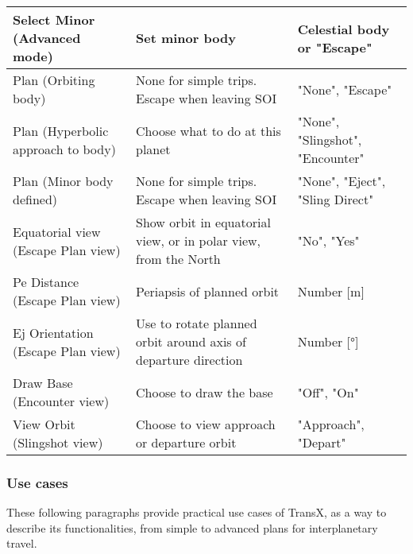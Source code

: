 \documentclass[Orbiter User Manual.tex]{subfiles}
\begin{document}
\begin{longtable}{ |p{}|p{}|p{}| }
	Select Minor (Advanced mode) & Set minor body & Celestial body or "Escape"\\
	\hline\rule{0pt}{2ex}
	Plan (Orbiting body) & None for simple trips. Escape when leaving SOI & "None", "Escape"\\
	\hline\rule{0pt}{2ex}
	Plan (Hyperbolic approach to body) & Choose what to do at this planet & "None", "Slingshot", "Encounter"\\
	\hline\rule{0pt}{2ex}
	Plan (Minor body defined) & None for simple trips. Escape when leaving SOI & "None", "Eject", "Sling Direct"\\
	\hline\rule{0pt}{2ex}
	Equatorial view (Escape Plan view) & Show orbit in equatorial view, or in polar view, from the North & "No", "Yes"\\
	\hline\rule{0pt}{2ex}
	Pe Distance (Escape Plan view) & Periapsis of planned orbit & Number [m]\\
	\hline\rule{0pt}{2ex}
	Ej Orientation (Escape Plan view) & Use to rotate planned orbit around axis of departure direction & Number [°]\\
	\hline\rule{0pt}{2ex}
	Draw Base (Encounter view) & Choose to draw the base & "Off", "On"\\
	\hline\rule{0pt}{2ex}
	View Orbit (Slingshot view) & Choose to view approach or departure orbit & "Approach", "Depart"\\
	\hline
	\end{longtable}


\subsubsection{Use cases}
These following paragraphs provide practical use cases of TransX, as a way to describe its functionalities, from simple to advanced plans for interplanetary travel.\\
\end{document}
